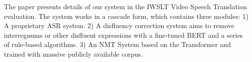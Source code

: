 The paper presents details of our system in the IWSLT Video Speech Translation evaluation. The system works in a cascade form, which contains three modules: 1) A proprietary ASR system. 2) A disfluency correction system aims to remove interregnums or other disfluent expressions with a fine-tuned BERT and a series of rule-based algorithms. 3) An NMT System based on the Transformer and trained with massive publicly available corpus.
